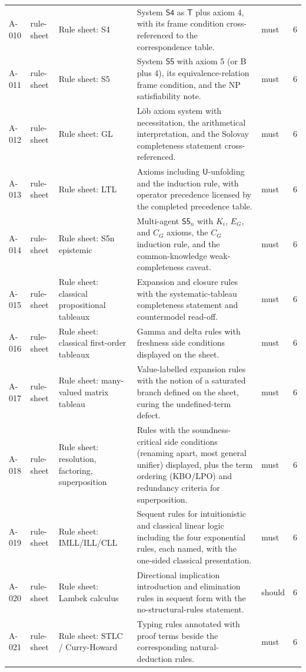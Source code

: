 \begin{longtable}{@{}p{0.45in}p{0.78in}p{2.02in}p{2.6in}p{0.42in}p{0.16in}@{}}
A-010 & rule-sheet & Rule sheet: S4 & System \(\mathsf{S4}\) as \(\mathsf T\) plus axiom 4, with its frame condition cross-referenced to the correspondence table. & must & 6 \\
A-011 & rule-sheet & Rule sheet: S5 & System \(\mathsf{S5}\) with axiom 5 (or B plus 4), its equivalence-relation frame condition, and the NP satisfiability note. & must & 6 \\
A-012 & rule-sheet & Rule sheet: GL & L\"ob axiom system with necessitation, the arithmetical interpretation, and the Solovay completeness statement cross-referenced. & must & 6 \\
A-013 & rule-sheet & Rule sheet: LTL & Axioms including \(\mathsf U\)-unfolding and the induction rule, with operator precedence licensed by the completed precedence table. & must & 6 \\
A-014 & rule-sheet & Rule sheet: S5n epistemic & Multi-agent \(\mathsf{S5}_n\) with \(K_i\), \(E_G\), and \(C_G\) axioms, the \(C_G\) induction rule, and the common-knowledge weak-completeness caveat. & must & 6 \\
A-015 & rule-sheet & Rule sheet: classical propositional tableaux & Expansion and closure rules with the systematic-tableau completeness statement and countermodel read-off. & must & 6 \\
A-016 & rule-sheet & Rule sheet: classical first-order tableaux & Gamma and delta rules with freshness side conditions displayed on the sheet. & must & 6 \\
A-017 & rule-sheet & Rule sheet: many-valued matrix tableau & Value-labelled expansion rules with the notion of a saturated branch defined on the sheet, curing the undefined-term defect. & must & 6 \\
A-018 & rule-sheet & Rule sheet: resolution, factoring, superposition & Rules with the soundness-critical side conditions (renaming apart, most general unifier) displayed, plus the term ordering (KBO/LPO) and redundancy criteria for superposition. & must & 6 \\
A-019 & rule-sheet & Rule sheet: IMLL/ILL/CLL & Sequent rules for intuitionistic and classical linear logic including the four exponential rules, each named, with the one-sided classical presentation. & must & 6 \\
A-020 & rule-sheet & Rule sheet: Lambek calculus & Directional implication introduction and elimination rules in sequent form with the no-structural-rules statement. & should & 6 \\
A-021 & rule-sheet & Rule sheet: STLC / Curry-Howard & Typing rules annotated with proof terms beside the corresponding natural-deduction rules. & must & 6 \\

\end{longtable}
